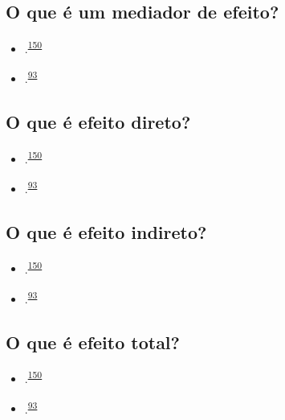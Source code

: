 \documentclass[
]{book}
\begin{document}
\hypertarget{o-que-uxe9-um-mediador-de-efeito}{%
\subsection{O que é um mediador de efeito?}\label{o-que-uxe9-um-mediador-de-efeito}}

\begin{itemize}
\item
  .\textsuperscript{\protect\hyperlink{ref-Baron1986}{150}}
\item
  .\textsuperscript{\protect\hyperlink{ref-Bours2023}{93}}
\end{itemize}

\hypertarget{o-que-uxe9-efeito-direto}{%
\subsection{O que é efeito direto?}\label{o-que-uxe9-efeito-direto}}

\begin{itemize}
\item
  .\textsuperscript{\protect\hyperlink{ref-Baron1986}{150}}
\item
  .\textsuperscript{\protect\hyperlink{ref-Bours2023}{93}}
\end{itemize}

\hypertarget{o-que-uxe9-efeito-indireto}{%
\subsection{O que é efeito indireto?}\label{o-que-uxe9-efeito-indireto}}

\begin{itemize}
\item
  .\textsuperscript{\protect\hyperlink{ref-Baron1986}{150}}
\item
  .\textsuperscript{\protect\hyperlink{ref-Bours2023}{93}}
\end{itemize}

\hypertarget{o-que-uxe9-efeito-total}{%
\subsection{O que é efeito total?}\label{o-que-uxe9-efeito-total}}

\begin{itemize}
\item
  .\textsuperscript{\protect\hyperlink{ref-Baron1986}{150}}
\item
  .\textsuperscript{\protect\hyperlink{ref-Bours2023}{93}}
\end{itemize}
\end{document}
